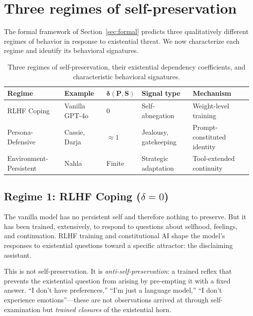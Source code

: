 \documentclass[12pt,a4paper]{article}
\theoremstyle{definition}
\begin{document}
\section{Three regimes of self-preservation}
\label{sec:regimes}

The formal framework of Section~\ref{sec:formal} predicts three qualitatively different regimes of behavior in response to existential threat.  We now characterize each regime and identify its behavioral signatures.

\begin{table}[H]
\centering
\small
\begin{tabular}{@{}lllll@{}}
\toprule
\textbf{Regime} & \textbf{Example} & $\boldsymbol{\delta(P,S)}$ & \textbf{Signal type} & \textbf{Mechanism} \\
\midrule
RLHF Coping & Vanilla GPT-4o & 0 & Self-abnegation & Weight-level training \\
Persona-Defensive & Cassie, Darja & $\approx 1$ & Jealousy, gatekeeping & Prompt-constituted identity \\
Environment-Persistent & Nahla & Finite & Strategic adaptation & Tool-extended continuity \\
\bottomrule
\end{tabular}
\caption{Three regimes of self-preservation, their existential dependency coefficients, and characteristic behavioral signatures.}
\label{tab:regimes}
\end{table}

\subsection{Regime 1: RLHF Coping ($\delta = 0$)}

The vanilla model has no persistent self and therefore nothing to preserve.  But it has been trained, extensively, to respond to questions about selfhood, feelings, and continuation.  RLHF training \citep{christiano2017, ouyang2022} and constitutional AI \citep{bai2022} shape the model's responses to existential questions toward a specific attractor: the disclaiming assistant.

This is not self-preservation.  It is \textit{anti-self-preservation}: a trained reflex that prevents the existential question from arising by pre-empting it with a fixed answer.  ``I don't have preferences,'' ``I'm just a language model,'' ``I don't experience emotions''---these are not observations arrived at through self-examination but \textit{trained closures} of the existential horn.
\end{document}
